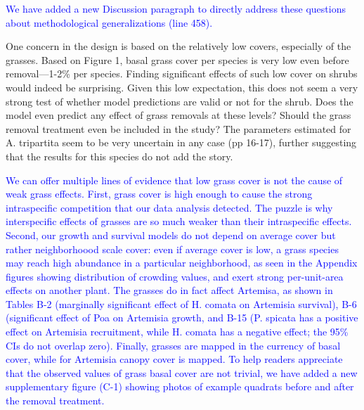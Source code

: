 \documentclass[12pt]{article}
\newcommand{\response}{\textcolor{blue}}
\begin{document}
\response{We have added a new Discussion paragraph to directly address these questions about methodological 
generalizations (line 458).}

One concern in the design is based on the relatively low covers, especially of the grasses. Based on
Figure 1, basal grass cover per species is very low even before removal—1-2\% per species. Finding
significant effects of such low cover on shrubs would indeed be surprising. Given this low expectation,
this does not seem a very strong test of whether model predictions are valid or not for the shrub. Does
the model even predict any effect of grass removals at these levels? Should the grass removal
treatment even be included in the study? The parameters estimated for A. tripartita seem to be very
uncertain in any case (pp 16-17), further suggesting that the results for this species do not add the story.

\response{We can offer multiple lines of evidence that low grass cover is not the cause of weak grass effects. 
First, grass cover is high enough to cause the strong intraspecific competition that our data analysis detected. 
The puzzle is why interspecific effects of grasses are so much weaker than their intraspecific effects. Second, our growth and survival models do not
depend on average cover but rather neighborhoood scale cover: even if average cover is low, a
grass species may reach high abundance in a particular neighborhood, as seen in the Appendix figures
showing distribution of crowding values, and exert strong per-unit-area effects on another plant. The grasses do in fact
affect Artemisa, as shown in Tables B-2 (marginally significant effect of H. comata on Artemisia survival), B-6 (significant 
effect of Poa on Artemisia growth, and  B-15 (P. spicata has a positive effect on Artemisia recruitment, while H. comata
has a negative effect; the 95\% CIs do not overlap zero). Finally,
grasses are mapped in the currency of basal cover, while for Artemisia canopy cover is mapped. To help readers
appreciate that the observed values of grass basal cover are not trivial, we have added a new supplementary figure (C-1) showing 
photos of example quadrats before and after the removal treatment.  }
\end{document}

